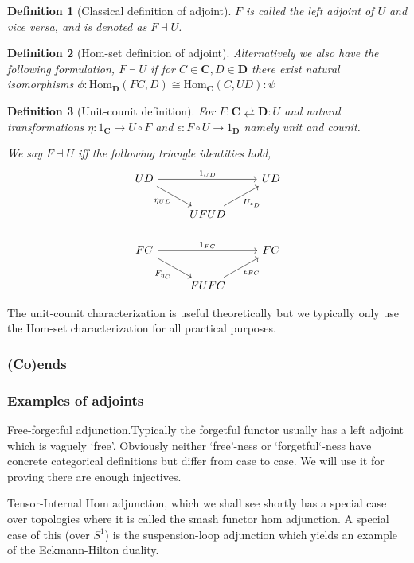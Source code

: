 \documentclass[12pt]{article}
\numberwithin{equation}{section}
\newtheorem{definition}{Definition}[section]
\begin{document}
\begin{appendices}
\begin{definition}[Classical definition of adjoint]
			$F$ is called the left adjoint of $U$ and vice versa, and is denoted as $F \dashv U$.
		\end{definition}
		
		\begin{definition}[Hom-set definition of adjoint]
			Alternatively we also have the following formulation, $F \dashv U$ if for $C\in \mathbf{C}, D \in \mathbf{D}$ there exist natural isomorphisms $\phi: \textrm{Hom}_\mathbf{D}(FC, D) \cong \textrm{Hom}_\mathbf{C}(C, UD):\psi$
		\end{definition}
		
		\begin{definition}[Unit-counit definition]
			For $F: \mathbf{C} \rightleftarrows \mathbf{D}:U$ and natural transformations $\eta: 1_\mathbf{C} \to U \circ F$ and $\epsilon: F \circ U \to 1_\mathbf{D}$ namely unit and counit. 
			
			We say $F \dashv U$ iff the following triangle identities hold,
			\[\begin{tikzcd}
				UD && UD \\
				& UFUD \\
				FC && FC \\
				& FUFC
				\arrow["{1_{UD}}", from=1-1, to=1-3]
				\arrow["{\eta_{UD}}"', from=1-1, to=2-2]
				\arrow["{U_{\epsilon_D}}"', from=2-2, to=1-3]
				\arrow["{1_{FC}}", from=3-1, to=3-3]
				\arrow["{F_{\eta_C}}"', from=3-1, to=4-2]
				\arrow["{\epsilon_{FC}}"', from=4-2, to=3-3]
			\end{tikzcd}\]
		\end{definition}
		The unit-counit characterization is useful theoretically but we typically only use the Hom-set characterization for all practical purposes.
		\subsubsection{(Co)ends}
		\subsubsection{Examples of adjoints}
		Free-forgetful adjunction.Typically the forgetful functor usually has a left adjoint which is vaguely `free'. Obviously neither `free'-ness or `forgetful`-ness have concrete categorical definitions but differ from case to case. We will use it for proving there are enough injectives.
		
		Tensor-Internal Hom adjunction, which we shall see shortly has a special case over topologies where it is called the smash functor hom adjunction. A special case of this (over $S^1$) is the suspension-loop adjunction which yields an example of the Eckmann-Hilton duality. 
		

\end{appendices}
\end{document}
